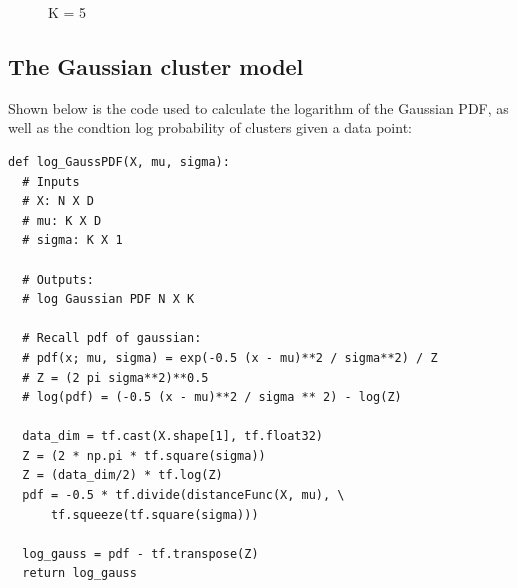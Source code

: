 \documentclass[12pt]{article}
\begin{document}
\begin{figure}[h]
    \centering
    \hfill
    \caption{K = 5}
\end{figure}

\newpage
\subsection{The Gaussian cluster model}
Shown below is the code used to calculate the logarithm of the Gaussian PDF, as well as
the condtion log probability of clusters given a data point:

\begin{verbatim}
def log_GaussPDF(X, mu, sigma):
  # Inputs
  # X: N X D
  # mu: K X D
  # sigma: K X 1

  # Outputs:
  # log Gaussian PDF N X K

  # Recall pdf of gaussian:
  # pdf(x; mu, sigma) = exp(-0.5 (x - mu)**2 / sigma**2) / Z
  # Z = (2 pi sigma**2)**0.5
  # log(pdf) = (-0.5 (x - mu)**2 / sigma ** 2) - log(Z)

  data_dim = tf.cast(X.shape[1], tf.float32)
  Z = (2 * np.pi * tf.square(sigma))
  Z = (data_dim/2) * tf.log(Z)
  pdf = -0.5 * tf.divide(distanceFunc(X, mu), \
      tf.squeeze(tf.square(sigma)))

  log_gauss = pdf - tf.transpose(Z)
  return log_gauss
\end{verbatim}
\end{document}
